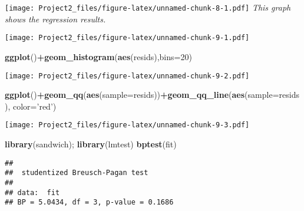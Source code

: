 \documentclass[]{article}
\newenvironment{Shaded}{\begin{snugshade}}{\end{snugshade}}
\newcommand{\DataTypeTok}[1]{\textcolor[rgb]{0.13,0.29,0.53}{#1}}
\newcommand{\DecValTok}[1]{\textcolor[rgb]{0.00,0.00,0.81}{#1}}
\newcommand{\KeywordTok}[1]{\textcolor[rgb]{0.13,0.29,0.53}{\textbf{#1}}}
\newcommand{\NormalTok}[1]{#1}
\newcommand{\OperatorTok}[1]{\textcolor[rgb]{0.81,0.36,0.00}{\textbf{#1}}}
\newcommand{\StringTok}[1]{\textcolor[rgb]{0.31,0.60,0.02}{#1}}
\begin{document}
\texttt{[image: Project2\_files/figure-latex/unnamed-chunk-8-1.pdf]}
\emph{This graph shows the regression results. }

\begin{Shaded}
\end{Shaded}

\texttt{[image: Project2\_files/figure-latex/unnamed-chunk-9-1.pdf]}

\begin{Shaded}
\begin{Highlighting}[]
\KeywordTok{ggplot}\NormalTok{()}\OperatorTok{+}\KeywordTok{geom_histogram}\NormalTok{(}\KeywordTok{aes}\NormalTok{(resids),}\DataTypeTok{bins=}\DecValTok{20}\NormalTok{)}
\end{Highlighting}
\end{Shaded}

\texttt{[image: Project2\_files/figure-latex/unnamed-chunk-9-2.pdf]}

\begin{Shaded}
\begin{Highlighting}[]
\KeywordTok{ggplot}\NormalTok{()}\OperatorTok{+}\KeywordTok{geom_qq}\NormalTok{(}\KeywordTok{aes}\NormalTok{(}\DataTypeTok{sample=}\NormalTok{resids))}\OperatorTok{+}\KeywordTok{geom_qq_line}\NormalTok{(}\KeywordTok{aes}\NormalTok{(}\DataTypeTok{sample=}\NormalTok{resids), }\DataTypeTok{color=}\StringTok{'red'}\NormalTok{)}
\end{Highlighting}
\end{Shaded}

\texttt{[image: Project2\_files/figure-latex/unnamed-chunk-9-3.pdf]}

\begin{Shaded}
\begin{Highlighting}[]
\KeywordTok{library}\NormalTok{(sandwich); }\KeywordTok{library}\NormalTok{(lmtest)}
\KeywordTok{bptest}\NormalTok{(fit)}
\end{Highlighting}
\end{Shaded}

\begin{verbatim}
## 
##  studentized Breusch-Pagan test
## 
## data:  fit
## BP = 5.0434, df = 3, p-value = 0.1686
\end{verbatim}
\end{document}
